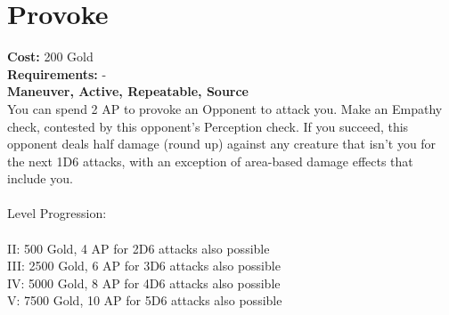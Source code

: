 \section{Provoke}
\textbf{Cost:} 200 Gold\\
\textbf{Requirements:} -\\
\textbf{Maneuver, Active, Repeatable, Source}\\
You can spend 2 AP to provoke an Opponent to attack you. Make an Empathy check, contested by this opponent’s Perception check. If you succeed, this opponent deals half damage (round up) against any creature that isn’t you for the next 1D6 attacks, with an exception of area-based damage effects that include you.\\
\\
Level Progression:\\
\\
II: 500 Gold, 4 AP for 2D6 attacks also possible\\
III: 2500 Gold, 6 AP for 3D6 attacks also possible\\
IV: 5000 Gold, 8 AP for 4D6 attacks also possible\\
V: 7500 Gold, 10 AP for 5D6 attacks also possible\\
